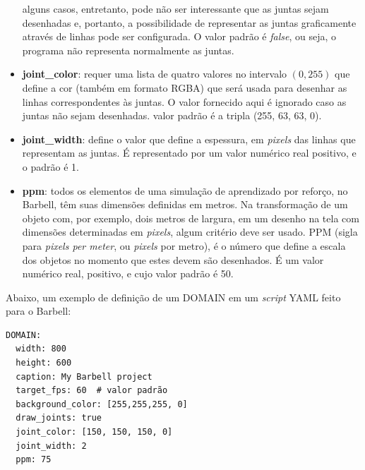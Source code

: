 \documentclass[cic,tc]{iiufrgs}
\begin{document}
\begin{itemize}
  alguns casos, entretanto, pode não ser interessante que as juntas sejam desenhadas e, portanto, a possibilidade de representar as juntas graficamente através
  de linhas pode ser configurada. O valor padrão é \textit{false}, ou seja, o programa não representa normalmente as juntas.
  \item \textbf{joint\_color}: requer uma lista de quatro valores no intervalo $(0, 255)$ que define a cor (também em formato RGBA) que será usada para desenhar as linhas correspondentes
  às juntas. O valor fornecido aqui é ignorado caso as juntas não sejam desenhadas. valor padrão é a tripla (255, 63, 63, 0).
  \item \textbf{joint\_width}: define o valor que define a espessura, em \textit{pixels} das linhas que representam as juntas. É representado por um valor numérico real positivo, e o
  padrão é 1.
  \item \textbf{ppm}: todos os elementos de uma simulação de aprendizado por reforço, no Barbell, têm suas dimensões definidas em metros. Na transformação de um objeto com,
  por exemplo, dois metros de largura, em um desenho na tela com dimensões determinadas em \textit{pixels}, algum critério deve ser usado. PPM (sigla para
  \textit{pixels per meter}, ou \textit{pixels} por metro), é o número que define a escala dos objetos no momento que estes devem são desenhados. É um valor numérico
  real, positivo, e cujo valor padrão é 50.
\end{itemize}


Abaixo, um exemplo de definição de um DOMAIN em um \textit{script} YAML feito para o Barbell:
\begin{verbatim}
DOMAIN:
  width: 800
  height: 600
  caption: My Barbell project
  target_fps: 60  # valor padrão
  background_color: [255,255,255, 0]
  draw_joints: true
  joint_color: [150, 150, 150, 0]
  joint_width: 2
  ppm: 75
\end{verbatim}
\end{document}
